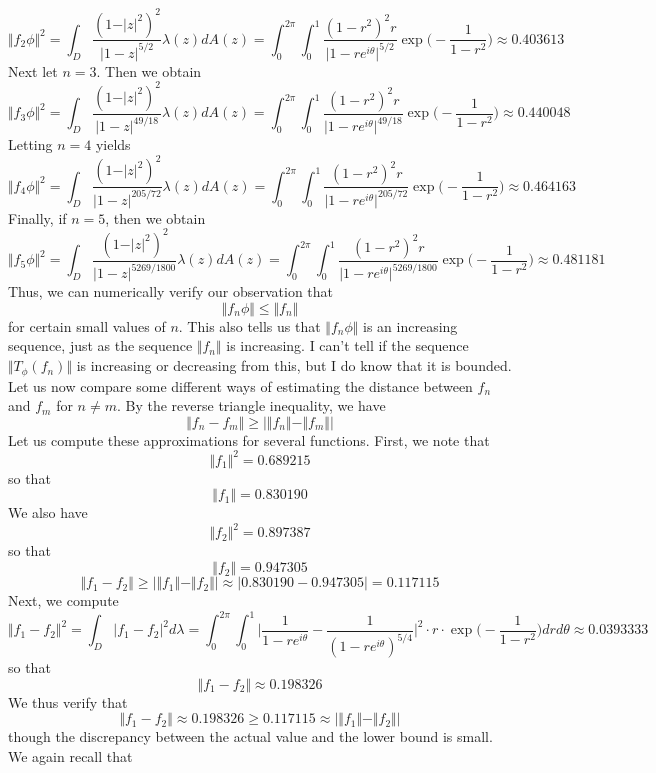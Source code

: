 \documentclass[12pt]{article}
\begin{document}
\[
\Vert f_2 \phi \Vert^2 = \int_D \frac{(1-\vert z \vert^2)^2}{\vert 1 - z \vert^{5/2}} \lambda(z) dA(z) = \int_0^{2\pi} \int_0^1 \frac{(1-r^2)^2 r}{\vert 1 - re^{i\theta} \vert^{5/2}} \exp\bigg(-\frac{1}{1-r^2}\bigg) \approx 0.403613
\] Next let $n = 3$. Then we obtain
\[
\Vert f_3 \phi \Vert^2 = \int_D  \frac{(1-\vert z \vert^2)^2}{\vert 1 - z \vert^{49/18}} \lambda(z) dA(z) =\int_0^{2\pi} \int_0^1 \frac{(1-r^2)^2 r}{\vert 1 - re^{i\theta} \vert^{49/18}} \exp\bigg(-\frac{1}{1-r^2}\bigg) \approx 0.440048
\] Letting $n = 4$ yields
\[
\Vert f_4 \phi \Vert^2 = \int_D  \frac{(1-\vert z \vert^2)^2}{\vert 1 - z \vert^{205/72}} \lambda(z) dA(z) =\int_0^{2\pi} \int_0^1 \frac{(1-r^2)^2 r}{\vert 1 - re^{i\theta} \vert^{205/72}} \exp\bigg(-\frac{1}{1-r^2}\bigg) \approx 0.464163
\] Finally, if $n=5$, then we obtain
\[
\Vert f_5 \phi \Vert^2 = \int_D  \frac{(1-\vert z \vert^2)^2}{\vert 1 - z \vert^{5269/1800}} \lambda(z) dA(z) =\int_0^{2\pi} \int_0^1 \frac{(1-r^2)^2 r}{\vert 1 - re^{i\theta} \vert^{5269/1800}} \exp\bigg(-\frac{1}{1-r^2}\bigg) \approx 0.481181
\] Thus, we can numerically verify our observation that
\[
\Vert f_n \phi \Vert \leq \Vert f_n \Vert
\] for certain small values of $n$. This also tells us that $\Vert f_n \phi \Vert$ is an increasing sequence, just as the sequence $\Vert f_n \Vert$ is increasing. I can't tell if the sequence $\Vert T_\phi(f_n) \Vert$ is increasing or decreasing from this, but I do know that it is bounded. Let us now compare some different ways of estimating the distance between $f_n$ and $f_m$ for $n \neq m$. By the reverse triangle inequality, we have
\[
\Vert f_n - f_m \Vert \geq \vert \Vert f_n \Vert - \Vert f_m \Vert \vert
\] Let us compute these approximations for several functions. First, we note that
\[
\Vert f_1 \Vert^2 = 0.689215
\] so that
\[
\Vert f_1 \Vert = 0.830190
\] We also have
\[
\Vert f_2 \Vert^2 = 0.897387
\] so that
\[
\Vert f_2 \Vert = 0.947305
\]
\[
\Vert f_1 - f_2 \Vert \geq  \vert \Vert f_1 \Vert - \Vert f_2 \Vert \vert \approx \vert 0.830190 - 0.947305 \vert = 0.117115
\] Next, we compute
\[
\Vert f_1 - f_2 \Vert^2 = \int_D \vert f_1 - f_2 \vert^2 d \lambda = \int_0^{2\pi} \int_0^1 \bigg\vert \frac{1}{1-re^{i\theta}} - \frac{1}{(1-re^{i\theta})^{5/4}} \bigg\vert^2 \cdot r \cdot \exp\bigg(-\frac{1}{1-r^2}\bigg) dr d\theta \approx 0.0393333
\] so that
\[
\Vert f_1 - f_2 \Vert \approx 0.198326
\] We thus verify that
\[
\Vert f_1 - f_2 \Vert \approx 0.198326 \geq 0.117115 \approx \vert \Vert f_1 \Vert - \Vert f_2 \Vert \vert
\] though the discrepancy between the actual value and the lower bound is small. We again recall that
\end{document}
